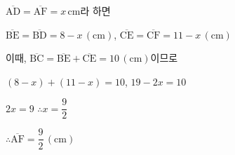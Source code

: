 $\overline{\mathrm{AD}} = \overline{\mathrm{AF}} = x\,\mathrm{cm}$라 하면

$\overline{\mathrm{BE}} = \overline{\mathrm{BD}} = 8 - x\,(\mathrm{cm})$, $\overline{\mathrm{CE}} = \overline{\mathrm{CF}} = 11 - x\,(\mathrm{cm})$

이때, $\overline{\mathrm{BC}} = \overline{\mathrm{BE}} + \overline{\mathrm{CE}} = 10\,(\mathrm{cm})$이므로

$(8 - x) + (11 - x) = 10$, $19 - 2x = 10$

$2x = 9$ $\therefore x = \dfrac{9}{2}$

$\therefore \overline{\mathrm{AF}} = \dfrac{9}{2}\,(\mathrm{cm})$

